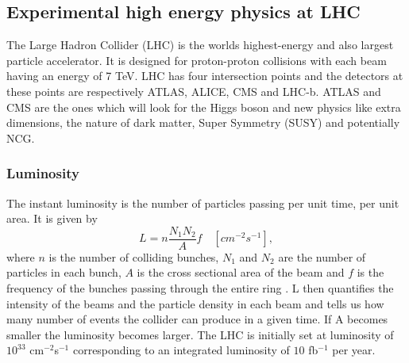 \subsection{Experimental high energy physics at LHC}
The Large Hadron Collider (LHC) is the worlds highest-energy and also largest particle accelerator. It is designed for proton-proton collisions with each beam having an energy of 7 TeV. LHC has four intersection points and the detectors at these points are respectively ATLAS, ALICE, CMS and LHC-b. ATLAS and CMS are the ones which will look for the Higgs boson and new physics like extra dimensions, the nature of dark matter, Super Symmetry (SUSY) and potentially NCG.

\subsubsection{Luminosity}
The instant luminosity is the number of particles passing per unit time, per unit area. It is given by
\begin{equation}
	L=n\frac{N_{1}N_{2}}{A}f \quad [cm^{-2}s^{-1}],
\end{equation}
where $n$ is the number of colliding bunches, $N_{1}$ and $N_{2}$ are the number of particles in each bunch, $A$ is the cross sectional area of the beam and $f$ is the frequency of the bunches passing through the entire ring \cite{martin1998pp}. L then quantifies the intensity of the beams and the particle density in each beam and tells us how many number of events the collider can produce in a given time. If A becomes smaller the luminosity becomes larger. The LHC is initially set at luminosity of $10^33$ cm$^{-2}$s$^{-1}$ corresponding to an integrated luminosity of $10$ fb$^{-1}$ per year.

